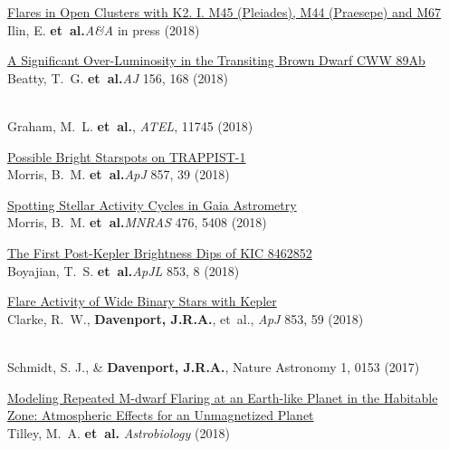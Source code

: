 \begin{etaremune}[leftmargin=10pt]

\item{\sc\href{https://arxiv.org/abs/1812.06725}{\color{NavyBlue}Flares in Open Clusters with K2. I. M45 (Pleiades), M44 (Praesepe) and M67}}\\
Ilin, E. {\bf et~al.}{\em A\&A} in press (2018)

\item{\sc\href{https://arxiv.org/abs/1807.11500}{\color{NavyBlue}A Significant Over-Luminosity in the Transiting Brown Dwarf CWW 89Ab}}\\
Beatty, T.~G. {\bf et~al.}{\em AJ} 156, 168 (2018)

\item{\href{http://www.astronomerstelegram.org/?read=11745}{\color{NavyBlue}{\sc ZTF Bright Transient Survey classifications}}}\\
Graham, M.~L. {\bf et~al.}, {\em ATEL}, 11745 (2018)


\item{\sc \href{https://arxiv.org/abs/1803.04543}{\color{NavyBlue}Possible Bright Starspots on TRAPPIST-1}}\\
Morris, B.~M. {\bf et~al.}{\em ApJ} 857, 39 (2018)


\item{\sc \href{https://arxiv.org/abs/1802.09943}{\color{NavyBlue}Spotting Stellar Activity Cycles in Gaia Astrometry}}\\
Morris, B.~M. {\bf et~al.}{\em MNRAS} 476, 5408 (2018)


\item{\sc \href{https://arxiv.org/abs/1801.00732}{\color{NavyBlue}The First Post-Kepler Brightness Dips of KIC 8462852}}\\
Boyajian, T.~S. {\bf et~al.}{\em ApJL} 853, 8 (2018)


\item{\sc \href{https://arxiv.org/abs/1712.04570}{\color{NavyBlue}Flare Activity of Wide Binary Stars with Kepler}}\\
Clarke, R.~W., {\bf Davenport, J.R.A.}, et~al., {\em ApJ} 853, 59 (2018)


\item\href{https://www.nature.com/articles/s41550-017-0153}{\color{NavyBlue}{\sc Who asks questions at astronomy meetings?}}\\ 
Schmidt, S. J., \& {\bf Davenport, J.R.A.}, Nature Astronomy 1, 0153 (2017)

\item{\sc \href{https://arxiv.org/abs/1711.08484}{\color{NavyBlue} Modeling Repeated M-dwarf Flaring at an Earth-like Planet in the Habitable Zone: Atmospheric Effects for an Unmagnetized Planet}}\\
Tilley, M.~A. {\bf et~al.} {\em Astrobiology} (2018)


\end{etaremune}
